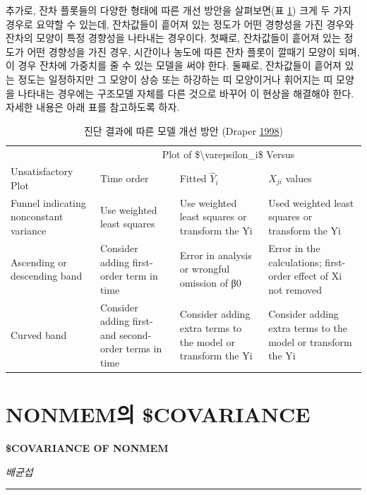 \documentclass[
  10pt,
  krantz2,
  a4paper]{krantz}
\theoremstyle{definition}
\theoremstyle{definition}
\theoremstyle{definition}
\theoremstyle{remark}
\begin{document}
추가로, 잔차 플롯들의 다양한 형태에 따른 개선 방안을 살펴보면(표 \ref{tab:diag-response}) 크게 두 가지 경우로 요약할 수 있는데, 잔차값들이 흩어져 있는 정도가 어떤 경향성을 가진 경우와 잔차의 모양이 특정 경향성을 나타내는 경우이다. 첫째로, 잔차값들이 흩어져 있는 정도가 어떤 경향성을 가진 경우, 시간이나 농도에 따른 잔차 플롯이 깔때기 모양이 되며, 이 경우 잔차에 가중치를 줄 수 있는 모델을 써야 한다. 둘째로, 잔차값들이 흩어져 있는 정도는 일정하지만 그 모양이 상승 또는 하강하는 띠 모양이거나 휘어지는 띠 모양을 나타내는 경우에는 구조모델 자체를 다른 것으로 바꾸어 이 현상을 해결해야 한다. 자세한 내용은 아래 표를 참고하도록 하자.

\begin{table}

\caption{\label{tab:diag-response}진단 결과에 따른 모델 개선 방안 (Draper \protect\hyperlink{ref-draper1998applied}{1998})}
\centering
\begin{tabular}[t]{llll}
\toprule
\multicolumn{1}{c}{ } & \multicolumn{3}{c}{Plot of \$\textbackslash{}varepsilon\_i\$ Versus} \\
\cmidrule(l{3pt}r{3pt}){2-4}
Unsatisfactory Plot & Time order & Fitted $\hat{Y}_i$ & $X_{ji}$ values\\
\midrule
Funnel indicating nonconstant variance & Use weighted least squares & Use weighted least squares or transform the Yi & Used weighted least squares or transform the Yi\\
Ascending or descending band & Consider adding first-order term in time & Error in analysis or wrongful omission of β0 & Error in the calculations; first-order effect of Xi not removed\\
Curved band & Consider adding first- and second- order terms in time & Consider adding extra terms to the model or transform the Yi & Consider adding extra terms to the model or transform the Yi\\
\bottomrule
\end{tabular}
\end{table}



\hypertarget{cov}{%
\chapter{NONMEM의 \$COVARIANCE}\label{cov}}

\textbf{\$COVARIANCE OF NONMEM}

\emph{배균섭}

\begin{center}\rule{0.5\linewidth}{0.5pt}\end{center}
\end{document}
